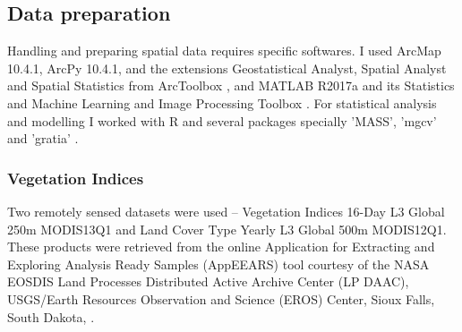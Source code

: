 




\subsection{Data preparation}  %


Handling and preparing spatial data requires specific softwares. I used ArcMap 10.4.1, ArcPy 10.4.1, and the extensions Geostatistical Analyst, Spatial Analyst and Spatial Statistics from ArcToolbox \citep{esri_2016,arcpy_2016}, and MATLAB R2017a and its Statistics and Machine Learning and Image Processing Toolbox \citep{matlab_2017}. For statistical analysis and modelling I worked with R \citep{R_2018} and several packages specially 'MASS'\citep{MASS_2002}, 'mgcv' \citep{Wood_2003, Wood_2004, Wood_2011, Wood_2017} and 'gratia' \citep{Gavin_2018}.

\subsubsection{Vegetation Indices} %
Two remotely sensed datasets were used – Vegetation Indices 16-Day L3 Global 250m MODIS13Q1 and Land Cover Type Yearly L3 Global 500m MODIS12Q1. These products were retrieved from the online Application for Extracting and Exploring Analysis Ready Samples (AppEEARS) tool courtesy of the NASA EOSDIS Land Processes Distributed Active Archive Center (LP DAAC), USGS/Earth Resources Observation and Science (EROS) Center, Sioux Falls, South Dakota, \citep{didan_2015,didan_munoz_2015,sulla_2015,sulla2_2018}.

